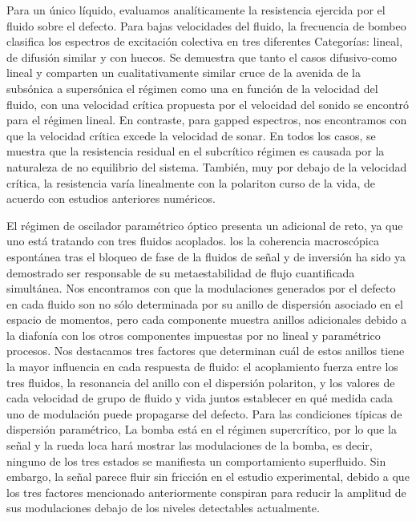 Para un único líquido, evaluamos analíticamente la resistencia
ejercida por el fluido sobre el defecto. Para bajas velocidades del
fluido, la frecuencia de bombeo clasifica los espectros de excitación
colectiva en tres diferentes Categorías: lineal, de difusión similar y
con huecos. Se demuestra que tanto el casos difusivo-como lineal y
comparten un cualitativamente similar cruce de la avenida de la
subsónica a supersónica el régimen como una en función de la velocidad
del fluido, con una velocidad crítica propuesta por el velocidad del
sonido se encontró para el régimen lineal. En contraste, para gapped
espectros, nos encontramos con que la velocidad crítica excede la
velocidad de sonar. En todos los casos, se muestra que la resistencia
residual en el subcrítico régimen es causada por la naturaleza de no
equilibrio del sistema. También, muy por debajo de la velocidad
crítica, la resistencia varía linealmente con la polariton curso de la
vida, de acuerdo con estudios anteriores numéricos.

El régimen de oscilador paramétrico óptico presenta un adicional de
reto, ya que uno está tratando con tres fluidos acoplados. los la
coherencia macroscópica espontánea tras el bloqueo de fase de la
fluidos de señal y de inversión ha sido ya demostrado ser responsable
de su metaestabilidad de flujo cuantificada simultánea. Nos
encontramos con que la modulaciones generados por el defecto en cada
fluido son no sólo determinada por su anillo de dispersión asociado en
el espacio de momentos, pero cada componente muestra anillos
adicionales debido a la diafonía con los otros componentes impuestas
por no lineal y paramétrico procesos. Nos destacamos tres factores que
determinan cuál de estos anillos tiene la mayor influencia en cada
respuesta de fluido: el acoplamiento fuerza entre los tres fluidos, la
resonancia del anillo con el dispersión polariton, y los valores de
cada velocidad de grupo de fluido y vida juntos establecer en qué
medida cada uno de modulación puede propagarse del defecto. Para las
condiciones típicas de dispersión paramétrico, La bomba está en el
régimen supercrítico, por lo que la señal y la rueda loca hará mostrar
las modulaciones de la bomba, es decir, ninguno de los tres estados se
manifiesta un comportamiento superfluido. Sin embargo, la señal parece
fluir sin fricción en el estudio experimental, debido a que los tres
factores mencionado anteriormente conspiran para reducir la amplitud
de sus modulaciones debajo de los niveles detectables actualmente.

